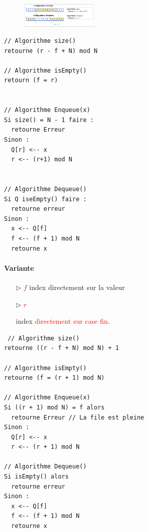 \documentclass{report}
\begin{document}
\begin{multicols*}{3}
  \begin{figure}[H]
    \begin{center}
      \includegraphics[width=0.33\textwidth]{FileSurTableau.png}
    \end{center}
  \end{figure}

  \begin{lstlisting}
// Algorithme size() 
retourne (r - f + N) mod N 

// Algorithme isEmpty() 
retourn (f = r)


// Algorithme Enqueue(x) 
Si size() = N - 1 faire : 
  retourne Erreur 
Sinon : 
  Q[r] <-- x 
  r <-- (r+1) mod N


// Algorithme Dequeue()
Si Q iseEmpty() faire : 
  retourne erreur 
Sinon :
  x <-- Q[f] 
  f <-- (f + 1) mod N 
  retourne x
  \end{lstlisting}


  \paragraph{Variante}
  \begin{itemize}
    \item [$\rhd$ ] \textcolor{red}{$f$} 
      index directement sur la valeur  
    \item [$\rhd$ ] \textcolor{red}{$r$} 
      
      index \textcolor{red}{directement sur case fin}. 
  \end{itemize}

\begin{lstlisting}
 // Algorithme size() 
retourne ((r - f + N) mod N) + 1

// Algorithme isEmpty() 
retourne (f = (r + 1) mod N)

// Algorithme Enqueue(x) 
Si ((r + 1) mod N) = f alors 
  retourne Erreur // La file est pleine
Sinon : 
  Q[r] <-- x 
  r <-- (r + 1) mod N

// Algorithme Dequeue()
Si isEmpty() alors 
  retourne erreur 
Sinon :
  x <-- Q[f] 
  f <-- (f + 1) mod N 
  retourne x
\end{lstlisting}
  
  
  
  
  






    














    \end{multicols*}
\end{document}
